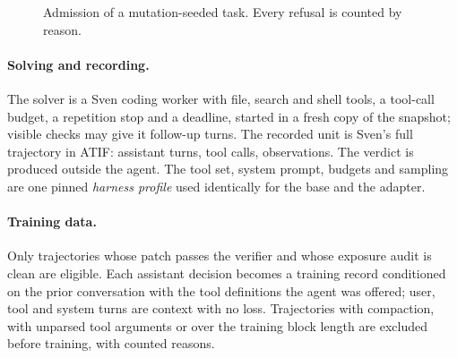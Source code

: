 \begin{figure}[t]
\centering
{}
\caption{Admission of a mutation-seeded task. Every refusal is counted by reason.}\label{fig:valid}
\end{figure}

\paragraph{Solving and recording.} The solver is a Sven coding worker with file,
search and shell tools, a tool-call budget, a repetition stop and a deadline, started in a
fresh copy of the snapshot; visible checks may give it follow-up turns. The recorded
unit is Sven's full trajectory in ATIF: assistant turns, tool calls, observations. The
verdict is produced outside the agent. The tool set, system prompt, budgets and
sampling are one pinned \emph{harness profile} used identically for the base and the
adapter.

\paragraph{Training data.} Only trajectories whose patch passes the verifier and whose
exposure audit is clean are eligible. Each assistant decision becomes a training record
conditioned on the prior conversation with the tool definitions the agent was offered;
user, tool and system turns are context with no loss. Trajectories with compaction, with
unparsed tool arguments or over the training block length are excluded before training,
with counted reasons.

